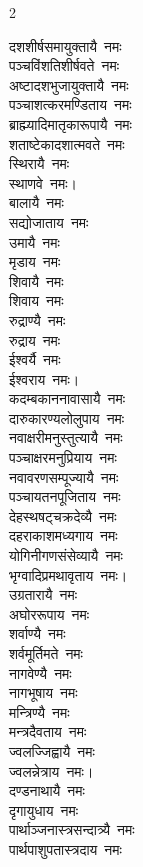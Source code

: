 \begin{multicols}{2}
\begin{flushleft}
दशशीर्षसमायुक्तायै~नमः\\
पञ्चविंशतिशीर्षवते~नमः\\
अष्टादशभुजायुक्तायै~नमः\\
पञ्चाशत्करमण्डिताय~नमः\\
ब्राह्म्यादिमातृकारूपायै~नमः\\
शताष्टेकादशात्मवते~नमः\\
स्थिरायै~नमः\\
स्थाणवे~नमः।\hfill{}\\
बालायै~नमः\\
सद्योजाताय~नमः\\
उमायै~नमः\\
मृडाय~नमः\\
शिवायै~नमः\\
शिवाय~नमः\\
रुद्राण्यै~नमः\\
रुद्राय~नमः\\
ईश्वर्यै~नमः\\
ईश्वराय~नमः।\hfill{}\\
कदम्बकाननावासायै~नमः\\
दारुकारण्यलोलुपाय~नमः\\
नवाक्षरीमनुस्तुत्यायै~नमः\\
पञ्चाक्षरमनुप्रियाय~नमः\\
नवावरणसम्पूज्यायै~नमः\\
पञ्चायतनपूजिताय~नमः\\
देहस्थषट्चक्रदेव्यै~नमः\\
दहराकाशमध्यगाय~नमः\\
योगिनीगणसंसेव्यायै~नमः\\
भृग्वादिप्रमथावृताय~नमः।\hfill{}\\
उग्रतारायै~नमः\\
अघोररूपाय~नमः\\
शर्वाण्यै~नमः\\
शर्वमूर्तिमते~नमः\\
नागवेण्यै~नमः\\
नागभूषाय~नमः\\
मन्त्रिण्यै~नमः\\
मन्त्रदैवताय~नमः\\
ज्वलज्जिह्वायै~नमः\\
ज्वलन्नेत्राय~नमः।\hfill{}\\
दण्डनाथायै~नमः\\
दृगायुधाय~नमः\\
पार्थाञ्जनास्त्रसन्दात्र्यै~नमः\\
पार्थपाशुपतास्त्रदाय~नमः\\

\end{flushleft}
\end{multicols}
